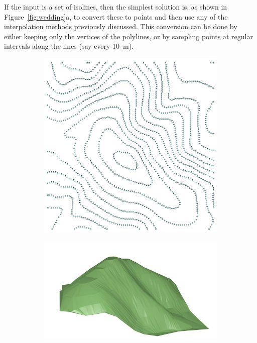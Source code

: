 If the input is a set of isolines, then the simplest solution is, as shown in Figure~\ref{fig:wedding}a, to convert these to points and then use any of the interpolation methods previously discussed.
This conversion can be done by either keeping only the vertices of the polylines, or by sampling points at regular intervals along the lines (say every \qty{10}{\m}).
\begin{figure}
  \centering
  \begin{subfigure}[b]{0.25\linewidth}
    \centering
    \includegraphics[width=\textwidth]{figs/wedding0.png}
    \caption{}
  \end{subfigure}%
  \begin{subfigure}[b]{0.33\linewidth}
    \centering
    \includegraphics[width=\textwidth]{figs/wedding-tin.png}

\end{subfigure}
\end{figure}
